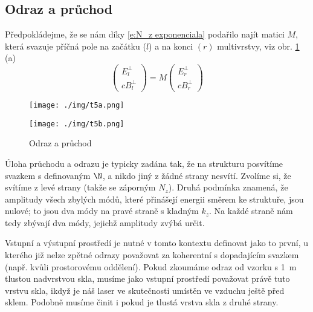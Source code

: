 \subsection*{Odraz a průchod}

Předpokládejme, že se nám díky \eqref{e:N_z exponenciala} podařilo najít matici $M$, která svazuje příčná pole na začátku ($l$) a na konci $(r)$ multivrstvy, viz obr. \ref{f:odraz a pruchod} (a)
\begin{equation}
\begin{pmatrix} E^\perp_l \\ cB^\perp_l \end{pmatrix}=M \begin{pmatrix} E^\perp_r \\ cB^\perp_r \end{pmatrix}
\end{equation}

\begin{figure}
\centering
\begin{minipage}{.5\textwidth}
  \centering
  \texttt{[image: ./img/t5a.png]}
\end{minipage}%
\begin{minipage}{.5\textwidth}
  \centering
  \texttt{[image: ./img/t5b.png]}
\end{minipage}
\caption{Odraz a průchod}\label{f:odraz a pruchod}
\end{figure}

Úloha průchodu a odrazu je typicky zadána tak, že na strukturu posvítíme svazkem s definovaným $\N$, a nikdo jiný z žádné strany nesvítí.
Zvolíme si, že svítíme z levé strany (takže se záporným $N_z$).
Druhá podmínka znamená, že amplitudy všech zbylých módů, které přinášejí energii směrem ke struktuře, jsou nulové; to jsou dva módy na pravé straně s kladným $k_z$.
Na každé straně nám tedy zbývají dva módy, jejichž amplitudy zvýbá určit.

Vstupní a výstupní prostředí je nutné v tomto kontextu definovat jako to první, u kterého již nelze zpětné odrazy považovat za koherentní s dopadajícím svazkem (např. kvůli prostorovému oddělení).
Pokud zkoumáme odraz od vzorku s \SI{1}{\meter} tlustou nadvrstvou skla, musíme jako vstupní prostředí považovat právě tuto vrstvu skla, ikdyž je náš laser ve skutečnosti umístěn ve vzduchu ještě před sklem.
Podobně musíme činit i pokud je tlustá vrstva skla z druhé strany.

